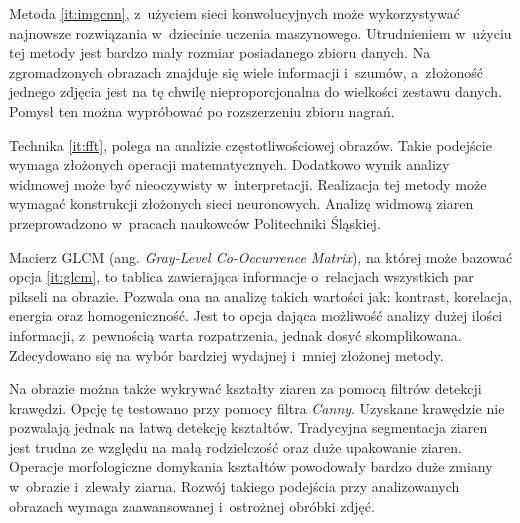 Metoda \ref{it:imgcnn}, z~użyciem sieci konwolucyjnych może
wykorzystywać najnowsze rozwiązania w~dziecinie uczenia maszynowego.
Utrudnieniem w~użyciu tej metody jest bardzo mały rozmiar posiadanego 
zbioru danych.
Na zgromadzonych obrazach znajduje się wiele informacji i~szumów,
a~złożoność jednego zdjęcia jest na tę chwilę nieproporcjonalna do wielkości
zestawu danych.
Pomysł ten można wypróbować po rozszerzeniu zbioru nagrań.

Technika \ref{it:fft}, polega na analizie częstotliwościowej obrazów.
Takie podejście wymaga złożonych operacji matematycznych.
Dodatkowo wynik analizy widmowej może być nieoczywisty w~interpretacji.
Realizacja tej metody może wymagać konstrukcji złożonych sieci neuronowych.
Analizę widmową ziaren przeprowadzono w~pracach naukowców Politechniki Śląskiej.

Macierz GLCM (ang. \textit{Gray-Level Co-Occurrence Matrix}), na której może
bazować opcja \ref{it:glcm}, to tablica zawierająca informacje o~relacjach
wszystkich par pikseli na obrazie.
Pozwala ona na analizę takich wartości jak: kontrast, korelacja, energia
oraz homogeniczność.
Jest to opcja dająca możliwość analizy dużej ilości informacji, z~pewnością
warta rozpatrzenia, jednak dosyć skomplikowana.
Zdecydowano się na wybór bardziej wydajnej i~mniej złożonej metody.

Na obrazie można także wykrywać kształty ziaren za pomocą filtrów detekcji
krawędzi.
Opcję tę testowano przy pomocy filtra \emph{Canny}.
Uzyskane krawędzie nie pozwalają jednak na łatwą detekcję kształtów.
Tradycyjna segmentacja ziaren jest trudna ze względu na małą rodzielczość
oraz duże upakowanie ziaren.
Operacje morfologiczne domykania kształtów powodowały bardzo duże zmiany
w~obrazie i~zlewały ziarna.
Rozwój takiego podejścia przy analizowanych obrazach wymaga zaawansowanej
i~ostrożnej obróbki zdjęć.

